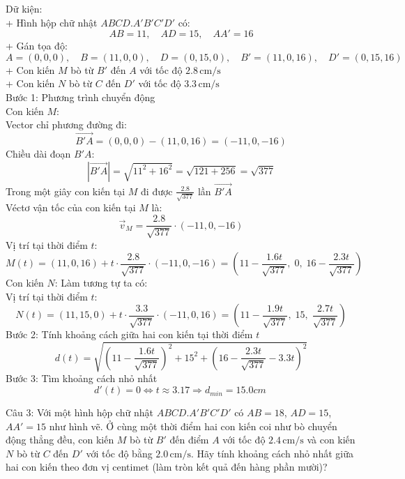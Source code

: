 \documentclass[a4paper,12pt]{article}
\begin{document}
Dữ kiện:\\
+ Hình hộp chữ nhật \(ABCD.A'B'C'D'\) có:\\
\[
AB = 11,\quad AD = 15,\quad AA' = 16
\]
+ Gán tọa độ:
\[
A = (0, 0, 0),\quad B = (11, 0, 0),\quad D = (0, 15, 0),\quad B' = (11, 0, 16),\quad D' = (0, 15, 16)
\]
+ Con kiến \(M\) bò từ \(B'\) đến \(A\) với tốc độ \(2.8\, \text{cm/s}\)\\
+ Con kiến \(N\) bò từ \(C\) đến \(D'\) với tốc độ \(3.3\, \text{cm/s}\)\\
Bước 1: Phương trình chuyển động\\
Con kiến \(M\):\\
Vector chỉ phương đường đi:
\[
\overrightarrow{B'A} = (0, 0, 0) - (11, 0, 16) = ( -11, 0, -16 )
\]
Chiều dài đoạn \(B'A\):
\[
|\overrightarrow{B'A}| = \sqrt{11^2 + 16^2} = \sqrt{121 + 256} = \sqrt{377}
\]
Trong một giây con kiến tại \(M\) đi được \(\frac{2.8}{\sqrt{377}}\) lần \(\overrightarrow{B'A}\)\\
Véctơ vận tốc của con kiến tại \(M\) là:
\[
\overrightarrow{v}_M = \frac{2.8}{\sqrt{377}} \cdot ( -11, 0, -16 )
\]
Vị trí tại thời điểm \(t\):
\[
M(t) = (11, 0, 16) + t \cdot \frac{2.8}{\sqrt{377}} \cdot ( -11, 0, -16 )
= \left( 11 - \frac{1.6t}{\sqrt{377}},\; 0,\; 16 - \frac{2.3t}{\sqrt{377}} \right)
\]
Con kiến \(N\): Làm tương tự ta có:\\
Vị trí tại thời điểm \(t\):
\[
N(t) = (11, 15, 0) + t \cdot \frac{3.3}{\sqrt{377}} \cdot (-11, 0, 16)
= \left( 11 - \frac{1.9t}{\sqrt{377}},\; 15,\; \frac{2.7t}{\sqrt{377}} \right)
\]
Bước 2: Tính khoảng cách giữa hai con kiến tại thời điểm \(t\)
\[
d(t) = \sqrt{\left(11 - \frac{1.6t}{\sqrt{377}}\right)^2 + 15^2 + \left(16 - \frac{2.3t}{\sqrt{377}} - 3.3t\right)^2}
\]
Bước 3: Tìm khoảng cách nhỏ nhất
\[
d'(t)=0\Leftrightarrow t \approx 3.17 \Rightarrow d_{min}=15.0cm\
\]




Câu 3: 
Với một hình hộp chữ nhật \(ABCD.A'B'C'D'\) có \(AB=18\), \(AD=15\), \(AA'=15\) như hình vẽ. Ở cùng một thời điểm hai con kiến coi như bò chuyển động thẳng đều, con kiến \(M\) bò từ \(B'\) đến điểm \(A\) với tốc độ \(2.4\,\mathrm{cm/s}\) và con kiến \(N\) bò từ \(C\) đến \(D'\) với tốc độ bằng \(2.0\,\mathrm{cm/s}\). Hãy tính khoảng cách nhỏ nhất giữa hai con kiến theo đơn vị centimet (làm tròn kết quả đến hàng phần mười)?
\end{document}
